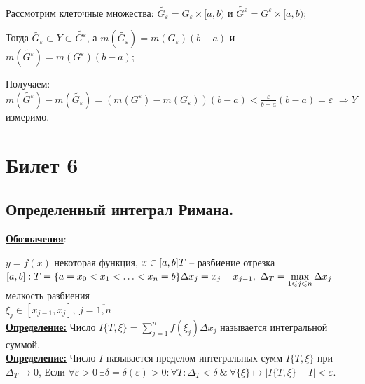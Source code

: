 \documentclass[a4paper,12pt]{article} %
\renewcommand {\leq}{\leqslant}
\begin{document}
Рассмотрим клеточные множества: $\widetilde{G_{\varepsilon}} = G_{\varepsilon}\times [a, b)$ и $\widetilde{G^{\varepsilon}} = G^{\varepsilon}\times [a, b)$;

\vspace{2mm}

Тогда $\widetilde{G_{\varepsilon}} \subset Y \subset \widetilde{G^{\varepsilon}}$, а $m(\widetilde{G_{\varepsilon}}) = m(G_{\varepsilon})(b-a)$ и $m(\widetilde{G^{\varepsilon}}) = m(G^{\varepsilon})(b-a)$;

Получаем: $m(\widetilde{G^{\varepsilon}}) - m(\widetilde{G_{\varepsilon}}) = (m(G^{\varepsilon}) - m(G_{\varepsilon}))(b-a) < \frac{\varepsilon}{b-a}(b-a) = \varepsilon$ $\Rightarrow Y$ измеримо.



\newpage
\section{Билет 6}

\subsection{Определенный интеграл Римана.}
\underline{\textbf{Обозначения}}:

$y = f(x)$ некоторая функция, $x \in [a,b]\\T$ -- разбиение отрезка $[a,b]: T = \{a = x_0 < x_1 < {\dots} < x_n = b \}\\\Delta x_j = x_j - x_{j-1},~\Delta_T = \max\limits_{1\leq j\leq n}\Delta x_j$ -- мелкость разбиения\\ $\xi_j \in [x_{j-1},x_j],~j = \overline{1,n}$\\

\underline{\textbf{Определение:}} Число $I\{T,\xi\} =  \sum\limits_{j = 1}^{n} {f(\xi_j)\Delta x_j}$ называется интегральной суммой.\\

\underline{\textbf{Определение:}} Число $I$ называется пределом интегральных сумм $I\{T,\xi\}$ при $\Delta_T \longrightarrow 0$, Если $\forall\varepsilon>0~\exists\delta = \delta(\varepsilon)>0: \forall T:\Delta_{T}<\delta~\&~ \forall\{\xi\} \longmapsto|I\{T, \xi\}-I|<\varepsilon$.\\
\end{document}
